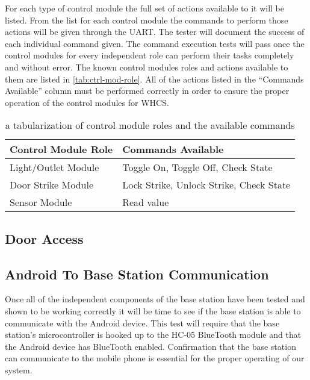 For each type of control module the full set of actions available to it will be
listed. From the list for each control module the commands to perform those
actions will be given through the UART. The tester will document the success of
each individual command given. The command execution tests will pass once the
control modules for every independent role can perform their tasks completely
and without error. The known control modules roles and actions available to
them are listed in \autoref{tab:ctrl-mod-role}. All of the actions listed in the
{}``Commands Available{}'' column must be performed correctly in order to
ensure the proper operation of the control modules for WHCS.

\begin{table}[H]
\centering
\begin{tabular}{|l|l|}
\hline
{\color{black} Control Module Role} &
{\color{black} Commands Available}\\\hline
{\color{black} Light/Outlet Module} &
{\color{black} Toggle On},
{\color{black} Toggle Off},
{\color{black} Check State}
\\\hline
{\color{black} Door Strike Module} &
{\color{black} Lock Strike},
{\color{black} Unlock Strike},
{\color{black} Check State}
\\\hline
{\color{black} Sensor Module} &
{\color{black} Read value}
\\\hline
\end{tabular}
\caption{a tabularization of control module roles and the available commands}
\label{tab:ctrl-mod-role}
\end{table}

\subsection{Door Access}
\tbw

\subsection{Android To Base Station Communication}
Once all of the independent components of the base station have been tested and
shown to be working correctly it will be time to see if the base station is
able to communicate with the Android device. This test will require that the
base station{}'s microcontroller is hooked up to the HC{}-05 BlueTooth module
and that the Android device has BlueTooth enabled. Confirmation that the base
station can communicate to the mobile phone is essential for the proper
operating of our system.

